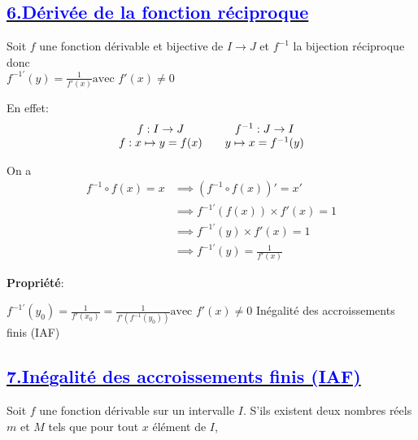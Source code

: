 \documentclass{article}
\begin{document}
\subsection*{\underline{\textbf{\textcolor{blue}{6.Dérivée de la fonction réciproque }}}}

Soit \( f \) une fonction dérivable et bijective de \( I \to J \)  et \( f^{-1} \) la bijection réciproque donc\\ \( f^{-1'}(y)=\frac{1}{f'(x)} \text{avec } f'(x)\neq 0\)

En effet: 
\[
\begin{array}{c c c c}
f : I \to J & & f^{-1} : J \to I \\
f : x \mapsto y = f(x) & & y \mapsto x = f^{-1}(y)
\end{array}
\]

On a 
\begin{align*}
 f^{-1}\circ f(x)=x &\implies (f^{-1}\circ f(x))'=x'\\
 											&\implies f^{-1'}(f(x))\times f'(x)=1 \\
 											&\implies f^{-1'}(y)\times f'(x)=1\\
											&\implies f^{-1'}(y) = \frac{1}{f'(x)}
\end{align*}


\textbf{Propriété}:

\( f^{-1'}(y_{0})=\frac{1}{f'(x_{0})}=\frac{1}{f'(f^{-1}(y_{0}))} \text{avec } f'(x)\neq 0\)
Inégalité des accroissements finis (IAF)

\subsection*{\underline{\textbf{\textcolor{blue}{7.Inégalité des accroissements finis (IAF) }}}}





Soit \( f \) une fonction dérivable sur un intervalle \( I \). S’ils existent deux nombres réels \( m \) et \( M \) tels que pour tout \( x \) élément de \( I \), 
\end{document}
